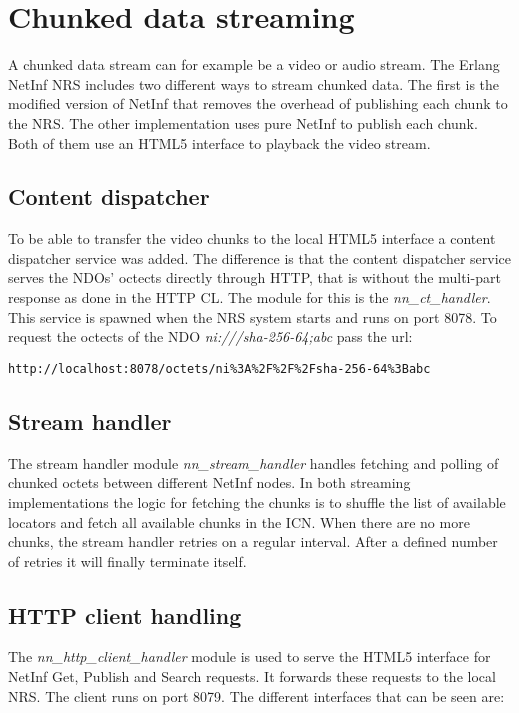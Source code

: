 \section{Chunked data streaming}
\label{sec:Chunkeddata}
A chunked data stream can for example be a video or audio stream. The Erlang NetInf NRS includes two different ways to stream chunked data. The first is the modified version of NetInf that removes the overhead of publishing each chunk to the NRS. The other implementation uses pure NetInf to publish each chunk. Both of them use an HTML5 interface to playback the video stream.


\subsection{Content dispatcher}

To be able to transfer the video chunks to the local HTML5 interface a content dispatcher service was added. The difference is that the content dispatcher service serves the NDOs' octects directly through HTTP, that is without the multi-part response as done in the HTTP CL. The module for this is the \textit{nn\_ct\_handler}. This service is spawned when the NRS system starts and runs on port 8078. To request the octects of the NDO \textit{ni:///sha-256-64;abc} pass the url:
\begin{verbatim}
http://localhost:8078/octets/ni%3A%2F%2F%2Fsha-256-64%3Babc 
\end{verbatim}

\subsection{Stream handler}
The stream handler module \textit{nn\_stream\_handler} handles fetching and polling of chunked octets between different NetInf nodes.
In both streaming implementations the logic for fetching the chunks is to shuffle the list of available locators and fetch all available chunks in the ICN. When there are no more chunks, the stream handler retries on a regular interval. After a defined number of retries it will finally terminate itself.  

\subsection{HTTP client handling}
The \textit{nn\_http\_client\_handler} module is used to serve the HTML5 interface for NetInf Get, Publish and Search requests. It forwards these requests to the local NRS. The client runs on port 8079. The different interfaces that can be seen are:

